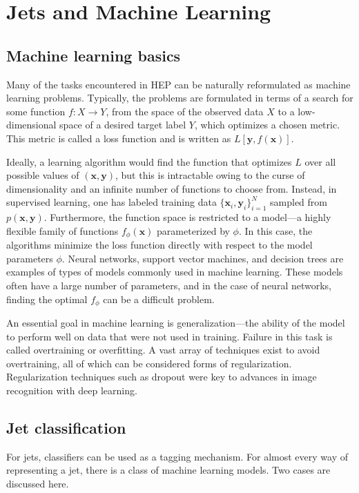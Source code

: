 \chapter{Jets and Machine Learning}
\label{app:ML}

\section{Machine learning basics}
Many of the tasks encountered in HEP can be naturally reformulated as machine learning problems. 
%
Typically, the problems are formulated in terms of a search for some function \(f:X \to Y\), from the space of the observed data \(X\) to a low-dimensional space of a desired target label \(Y\), which optimizes a chosen metric. 
%
This metric is called a loss function and is written as \(L[ \mathbf{y}, f (\mathbf{x})]\).
%

Ideally, a learning algorithm would find the function that optimizes \(L\) over all possible values
of \((\mathbf{x}, \mathbf{y})\), but this is intractable owing to the curse of dimensionality and an infinite number of functions to choose from. 
%
Instead, in supervised learning, one has labeled training data \(\{\mathbf{x}_i , \mathbf{y}_i\}^N_{i=1}\) sampled from \(p(\mathbf{x} , \mathbf{y})\). 
%
Furthermore, the function space is restricted to a model—a highly flexible family of functions \(f_\phi(\mathbf{x})\) parameterized by \(\phi\). 
%
In this case, the algorithms minimize the loss function directly with respect to the model parameters \(\phi\). 
%
Neural networks, support vector machines, and decision trees are examples of types of models commonly used in machine learning. 
%
These models often have a large number of parameters, and in the case of neural networks, finding the optimal \(f_\phi\) can be a difficult problem.
%

An essential goal in machine learning is generalization—the ability of the model to perform well on data that were not used in training. 
%
Failure in this task is called overtraining or overfitting. 
%
A vast array of techniques exist to avoid overtraining, all of which can be considered forms of regularization. 
%
Regularization techniques such as dropout were key to advances in image recognition with deep learning.

\section{Jet classification}
For jets, classifiers can be used as a tagging mechanism. 
%
For almost every way of representing a jet, there is a class of machine learning models.
%
Two cases are discussed here.
